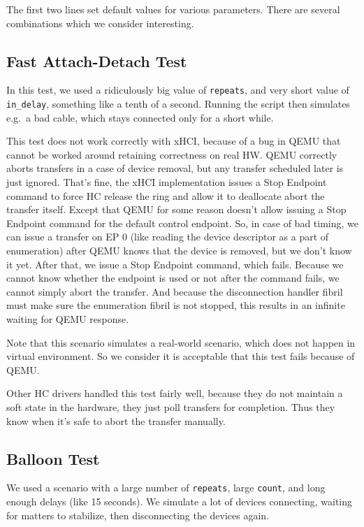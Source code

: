 The first two lines set default values for various parameters. There are
several combinations which we consider interesting.

\subsection{Fast Attach-Detach Test}

In this test, we used a ridiculously big value of \texttt{repeats}, and very
short value of \texttt{in\_delay}, something like a tenth of a second. Running
the script then simulates e.g.\ a bad cable, which stays connected only for
a short while.

This test does not work correctly with xHCI, because of a bug in QEMU that cannot
be worked around retaining correctness on real HW. QEMU correctly aborts
transfers in a case of device removal, but any transfer scheduled later is just
ignored. That's fine, the xHCI implementation issues a Stop Endpoint command to
force HC release the ring and allow it to deallocate abort the transfer itself.
Except that QEMU for some reason doesn't allow issuing a Stop Endpoint command
for the default control endpoint. So, in case of bad timing, we can issue
a transfer on EP 0 (like reading the device descriptor as a part of
enumeration) after QEMU knows that the device is removed, but we don't know it
yet. After that, we issue a Stop Endpoint command, which fails. Because we
cannot know whether the endpoint is used or not after the command fails, we
cannot simply abort the transfer. And because the disconnection handler fibril
must make sure the enumeration fibril is not stopped, this results in an
infinite waiting for QEMU response.

Note that this scenario simulates a real-world scenario, which does not happen
in virtual environment. So we consider it is acceptable that this test fails
because of QEMU.

Other HC drivers handled this test fairly well, because they do not maintain
a soft state in the hardware, they just poll transfers for completion. Thus
they know when it's safe to abort the transfer manually.

\subsection{Balloon Test}

We used a scenario with a large number of \texttt{repeats}, large \texttt{count},
and long enough delays (like 15 seconds). We simulate a lot of devices connecting,
waiting for matters to stabilize, then disconnecting the devices again.

